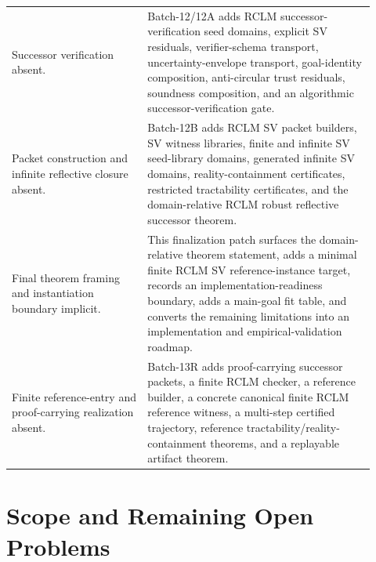 \documentclass[11pt,a4paper]{article}
\begin{document}
\begin{longtable}{p{0.34\linewidth}p{0.58\linewidth}}
Successor verification absent. & Batch-12/12A adds RCLM successor-verification seed domains, explicit SV residuals, verifier-schema transport, uncertainty-envelope transport, goal-identity composition, anti-circular trust residuals, soundness composition, and an algorithmic successor-verification gate.\\
Packet construction and infinite reflective closure absent. & Batch-12B adds RCLM SV packet builders, SV witness libraries, finite and infinite SV seed-library domains, generated infinite SV domains, reality-containment certificates, restricted tractability certificates, and the domain-relative RCLM robust reflective successor theorem.\\
Final theorem framing and instantiation boundary implicit. & This finalization patch surfaces the domain-relative theorem statement, adds a minimal finite RCLM SV reference-instance target, records an implementation-readiness boundary, adds a main-goal fit table, and converts the remaining limitations into an implementation and empirical-validation roadmap.\\
Finite reference-entry and proof-carrying realization absent. & Batch-13R adds proof-carrying successor packets, a finite RCLM checker, a reference builder, a concrete canonical finite RCLM reference witness, a multi-step certified trajectory, reference tractability/reality-containment theorems, and a replayable artifact theorem.\\
\bottomrule
\end{longtable}




\section{Scope and Remaining Open Problems}
\end{document}
